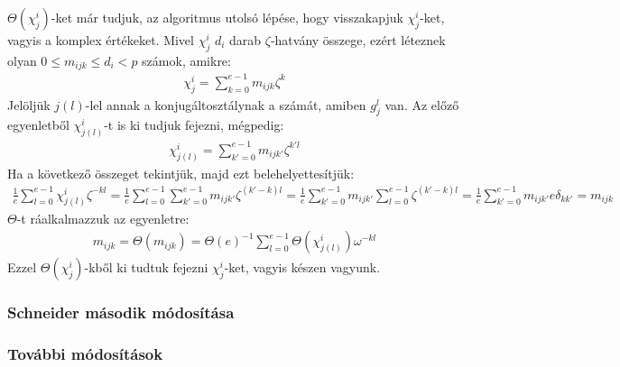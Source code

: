 $\Theta(\chi^i_j)$-ket már tudjuk, az algoritmus utolsó lépése, hogy visszakapjuk $\chi^i_j$-ket, vagyis a komplex értékeket.
Mivel $\chi^i_j$ $d_i$ darab $\zeta$-hatvány összege, ezért léteznek olyan $0\le m_{ijk}\le d_i < p$ számok, amikre:
\begin{align}
\label{eq:bdsmijk1}
\chi^i_j = \sum_{k=0}^{e-1} m_{ijk}\zeta^k
\end{align}
Jelöljük $j(l)$-lel annak a konjugáltosztálynak a számát, amiben $g_j^l$ van. Az előző egyenletből $\chi^i_{j(l)}$-t is ki tudjuk fejezni, mégpedig:
\begin{align}
\label{eq:bdsmijk2}
\chi^i_{j(l)} = \sum_{k'=0}^{e-1} m_{ijk'}\zeta^{k'l}
\end{align}
Ha a következő összeget tekintjük, majd ezt belehelyettesítjük:
\begin{align}
\label{eq:bdsmijk3}
\frac{1}{e}\sum_{l=0}^{e-1} \chi^i_{j(l)} \zeta^{-kl} = \frac{1}{e}\sum_{l=0}^{e-1} \sum_{k'=0}^{e-1} m_{ijk'}\zeta^{(k'-k)l} =
\frac{1}{e}\sum_{k'=0}^{e-1} m_{ijk'} \sum_{l=0}^{e-1} \zeta^{(k'-k)l} = \frac{1}{e}\sum_{k'=0}^{e-1} m_{ijk'} e \delta_{kk'} =
m_{ijk}
\end{align}
$\Theta$-t ráalkalmazzuk az egyenletre:
\begin{align}
\label{eq:bdsmijk4}
m_{ijk} = \Theta(m_{ijk}) = \Theta(e)^{-1} \sum_{l=0}^{e-1} \Theta(\chi^i_{j(l)}) \omega^{-kl}
\end{align}
Ezzel $\Theta(\chi^i_j)$-kből ki tudtuk fejezni $\chi^i_j$-ket, vagyis készen vagyunk.

\subsubsection{Schneider második módosítása}
\label{subsubsec:bdssch2}

\subsubsection{További módosítások}
\label{subsubsec:bdstovabbi}

